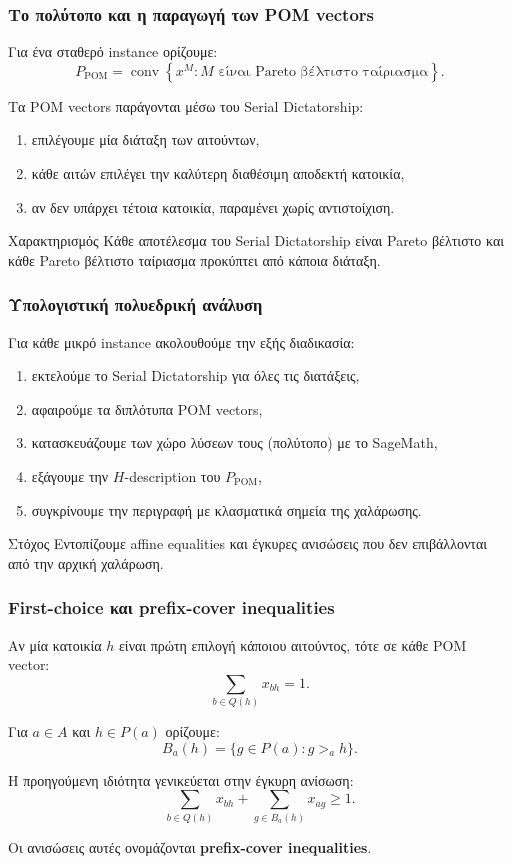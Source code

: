 \documentclass{beamer}
\begin{document}
	\begin{frame}
		\frametitle{Το πολύτοπο και η παραγωγή των POM vectors}
		
		Για ένα σταθερό instance ορίζουμε:
		\[
		P_{\mathrm{POM}}
		=
		\operatorname{conv}
		\left\{
		x^M:
		M\text{ είναι Pareto βέλτιστο ταίριασμα}
		\right\}.
		\]
		
		Τα POM vectors παράγονται μέσω του Serial Dictatorship:
		
		\begin{enumerate}
			\item επιλέγουμε μία διάταξη των αιτούντων,
			\item κάθε αιτών επιλέγει την καλύτερη διαθέσιμη αποδεκτή κατοικία,
			\item αν δεν υπάρχει τέτοια κατοικία, παραμένει χωρίς αντιστοίχιση.
		\end{enumerate}
		
		\begin{block}{Χαρακτηρισμός}
			Κάθε αποτέλεσμα του Serial Dictatorship είναι Pareto βέλτιστο και κάθε Pareto βέλτιστο ταίριασμα προκύπτει από κάποια διάταξη.
		\end{block}
	\end{frame}
	
	\begin{frame}
		\frametitle{Υπολογιστική πολυεδρική ανάλυση}
		
		Για κάθε μικρό instance ακολουθούμε την εξής διαδικασία:
		
		\begin{enumerate}
			\item εκτελούμε το Serial Dictatorship για όλες τις διατάξεις,
			\item αφαιρούμε τα διπλότυπα POM vectors,
			\item κατασκευάζουμε των χώρο λύσεων τους (πολύτοπο) με το SageMath,
			\item εξάγουμε την $H$-description του $P_{\mathrm{POM}}$,
			\item συγκρίνουμε την περιγραφή με κλασματικά σημεία της χαλάρωσης.
		\end{enumerate}
		
		\begin{block}{Στόχος}
			Εντοπίζουμε affine equalities και έγκυρες ανισώσεις που δεν επιβάλλονται από την αρχική χαλάρωση.
		\end{block}
	\end{frame}
	
	\begin{frame}
		\frametitle{First-choice και prefix-cover inequalities}
		
		Αν μία κατοικία $h$ είναι πρώτη επιλογή κάποιου αιτούντος, τότε σε κάθε POM vector:
		\[
		\sum_{b\in Q(h)}x_{bh}=1.
		\]
		
		Για $a\in A$ και $h\in P(a)$ ορίζουμε:
		\[
		B_a(h)=\{g\in P(a):g>_a h\}.
		\]
		
		Η προηγούμενη ιδιότητα γενικεύεται στην έγκυρη ανίσωση:
		\[
		\sum_{b\in Q(h)}x_{bh}
		+
		\sum_{g\in B_a(h)}x_{ag}
		\geq 1.
		\]
		
		Οι ανισώσεις αυτές ονομάζονται \textbf{prefix-cover inequalities}.
	\end{frame}
	
\end{document}
